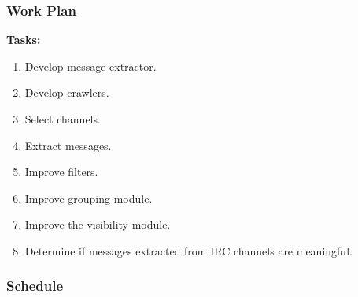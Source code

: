 \documentclass{beamer}
\begin{document}

\begin{frame}
\frametitle{Work Plan}

\textbf{Tasks: }

\begin{enumerate}
    \item{Develop message extractor.}
    \item{Develop crawlers.}
    \item{Select channels.}
    \item{Extract messages.}
    \item{Improve filters.}
    \item{Improve grouping module.}
    \item{Improve the visibility module.}
    \item{Determine if messages extracted from IRC channels are meaningful.}
\end{enumerate}

\end{frame}


\begin{frame}
\frametitle{Schedule}
\begin{center}
    \begin{table}
        \caption{Schedule.}
        \label{table:schedule}
    \end{table}
\end{center}
\end{frame}
\end{document}
